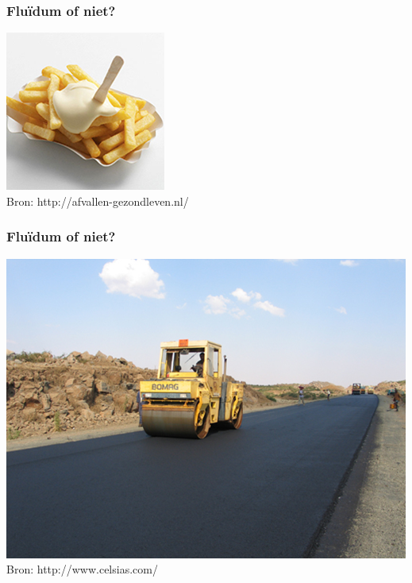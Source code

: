 \documentclass[t]{beamer}
\begin{document}
  		\begin{frame}
  			\frametitle{Fluïdum of niet?}
			\center
    		\includegraphics[height=0.8\textheight]{fig/basisbegrippen/mayonaise.png}\\
			\footnotesize{Bron: http://afvallen-gezondleven.nl/}
  		\end{frame}
  		\begin{frame}
  			\frametitle{Fluïdum of niet?}
			\center
    		\includegraphics[height=0.8\textheight]{fig/basisbegrippen/asfalt.png}\\
			\footnotesize{Bron: http://www.celsias.com/}
  		\end{frame}
\end{document}
